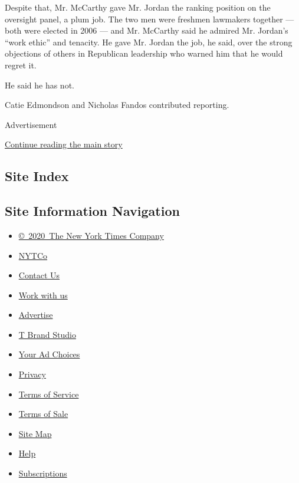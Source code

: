 Despite that, Mr. McCarthy gave Mr. Jordan the ranking position on the
oversight panel, a plum job. The two men were freshmen lawmakers
together --- both were elected in 2006 --- and Mr. McCarthy said he
admired Mr. Jordan's ``work ethic'' and tenacity. He gave Mr. Jordan the
job, he said, over the strong objections of others in Republican
leadership who warned him that he would regret it.

He said he has not.

Catie Edmondson and Nicholas Fandos contributed reporting.

Advertisement

\protect\hyperlink{after-bottom}{Continue reading the main story}

\hypertarget{site-index}{%
\subsection{Site Index}\label{site-index}}

\hypertarget{site-information-navigation}{%
\subsection{Site Information
Navigation}\label{site-information-navigation}}

\begin{itemize}
\tightlist
\item
  \href{https://help.nytimes3xbfgragh.onion/hc/en-us/articles/115014792127-Copyright-notice}{©~2020~The
  New York Times Company}
\end{itemize}

\begin{itemize}
\tightlist
\item
  \href{https://www.nytco.com/}{NYTCo}
\item
  \href{https://help.nytimes3xbfgragh.onion/hc/en-us/articles/115015385887-Contact-Us}{Contact
  Us}
\item
  \href{https://www.nytco.com/careers/}{Work with us}
\item
  \href{https://nytmediakit.com/}{Advertise}
\item
  \href{http://www.tbrandstudio.com/}{T Brand Studio}
\item
  \href{https://www.nytimes3xbfgragh.onion/privacy/cookie-policy\#how-do-i-manage-trackers}{Your
  Ad Choices}
\item
  \href{https://www.nytimes3xbfgragh.onion/privacy}{Privacy}
\item
  \href{https://help.nytimes3xbfgragh.onion/hc/en-us/articles/115014893428-Terms-of-service}{Terms
  of Service}
\item
  \href{https://help.nytimes3xbfgragh.onion/hc/en-us/articles/115014893968-Terms-of-sale}{Terms
  of Sale}
\item
  \href{https://spiderbites.nytimes3xbfgragh.onion}{Site Map}
\item
  \href{https://help.nytimes3xbfgragh.onion/hc/en-us}{Help}
\item
  \href{https://www.nytimes3xbfgragh.onion/subscription?campaignId=37WXW}{Subscriptions}
\end{itemize}
